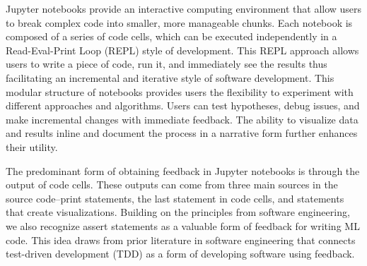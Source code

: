 Jupyter notebooks provide an interactive computing environment that allow users to break complex code into smaller, more manageable chunks. Each notebook is composed of a series of code cells, which can be executed independently in a Read-Eval-Print Loop (REPL) style of development. This REPL approach allows users to write a piece of code, run it, and immediately see the results thus facilitating an incremental and iterative style of software development. This modular structure of notebooks provides users the flexibility to experiment with different approaches and algorithms. Users can test hypotheses, debug issues, and make incremental changes with immediate feedback. The ability to visualize data and results inline and document the process in a narrative form further enhances their utility.



The predominant form of obtaining feedback in Jupyter notebooks is through the output of code cells. These outputs can come from three main sources in the source code--print statements, the last statement in code cells, and statements that create visualizations. Building on the principles from software engineering, we also recognize assert statements as a valuable form of feedback for writing ML code. This idea draws from prior literature in software engineering that connects test-driven development (TDD) as a form of developing software using feedback.


